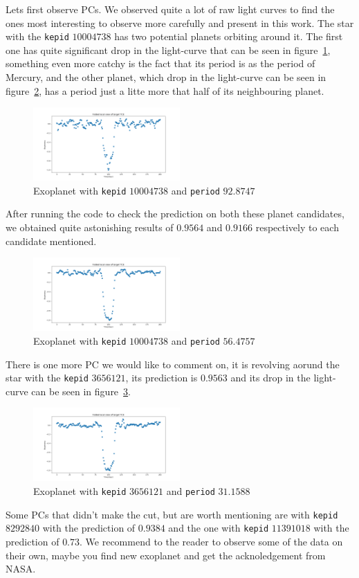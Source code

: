 \documentclass[twoside]{article}
\newcommand{\code}[1]{\texttt{#1}}
\begin{document}
\begin{multicols}{2}
Lets first observe PCs. We observed quite a lot of raw light curves to find the ones most interesting to observe more carefully and present in this work. The star with the \code{kepid} $10004738$ has two potential planets orbiting around it. The first one has quite significant drop in the light-curve that can be seen in figure~\ref{fig:resPC1}, something even more catchy is the fact that its period is as the period of Mercury, and the other planet, which drop in the light-curve can be seen in figure~\ref{fig:resPC11}, has a period just a litte more that half of its neighbouring planet. 
\begin{figure}[H]
\includegraphics[width=0.5\textwidth]{resPC1}
\caption{Exoplanet with \code{kepid} $10004738$ and \code{period} $92.8747$}
\label{fig:resPC1}
\end{figure}

After running the code to check the prediction on both these planet candidates, we obtained quite astonishing results of $0.9564$ and $0.9166$ respectively to each candidate mentioned.
\begin{figure}[H]
\includegraphics[width=0.5\textwidth]{resPC11}
\caption{Exoplanet with \code{kepid} $10004738$ and \code{period} $56.4757$}
\label{fig:resPC11}
\end{figure}

There is one more PC we would like to comment on, it is revolving aorund the star with the \code{kepid} $3656121$, its prediction is $0.9563$ and its drop in the light-curve can be seen in figure~\ref{fig:resPC2}.
\begin{figure}[H]
\includegraphics[width=0.5\textwidth]{resPC2}
\caption{Exoplanet with \code{kepid} $3656121$ and \code{period} $31.1588$}
\label{fig:resPC2}
\end{figure}
Some PCs that didn't make the cut, but are worth mentioning are with \code{kepid} $8292840$ with the prediction of $0.9384$ and the one with \code{kepid} $11391018$ with the prediction of $0.73$. We recommend to the reader to observe some of the data on their own, maybe you find new exoplanet and get the acknoledgement from NASA. 


\end{multicols}
\end{document}
